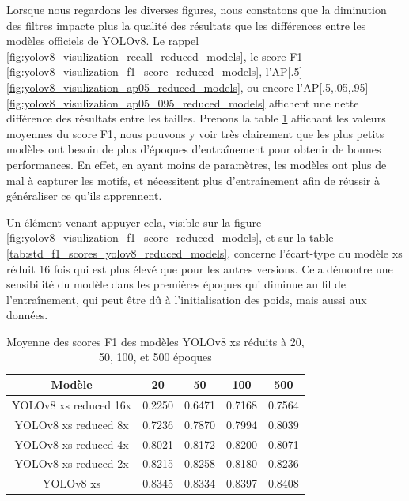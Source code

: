 \break

Lorsque nous regardons les diverses figures, nous constatons que la diminution des filtres impacte plus la qualité des résultats que les différences entre les modèles officiels de YOLOv8. Le rappel \ref{fig:yolov8_visulization_recall_reduced_models}, le score F1 \ref{fig:yolov8_visulization_f1_score_reduced_models}, l'AP[.5] \ref{fig:yolov8_visulization_ap05_reduced_models}, ou encore l'AP[.5,.05,.95] \ref{fig:yolov8_visulization_ap05_095_reduced_models} affichent une nette différence des résultats entre les tailles. Prenons la table \ref{tab:mean_f1_scores_yolov8_reduced_models} affichant les valeurs moyennes du score F1, nous pouvons y voir très clairement que les plus petits modèles ont besoin de plus d'époques d'entraînement pour obtenir de bonnes performances. En effet, en ayant moins de paramètres, les modèles ont plus de mal à capturer les motifs, et nécessitent plus d'entraînement afin de réussir à généraliser ce qu'ils apprennent.

Un élément venant appuyer cela, visible sur la figure \ref{fig:yolov8_visulization_f1_score_reduced_models}, et sur la table \ref{tab:std_f1_scores_yolov8_reduced_models}, concerne l'écart-type du modèle xs réduit 16 fois qui est plus élevé que pour les autres versions. Cela démontre une sensibilité du modèle dans les premières époques qui diminue au fil de l'entraînement, qui peut être dû à l'initialisation des poids, mais aussi aux données.

\begin{table}[!ht]
    \caption{Moyenne des scores F1 des modèles YOLOv8 xs réduits à 20, 50, 100, et 500 époques}
    \label{tab:mean_f1_scores_yolov8_reduced_models}
    \centering
    \begin{tabular}{ |c||c|c|c|c|  }
        \hline
        \rowcolor{gray!50}
        Modèle & 20 & 50 & 100 & 500\\
        \hline
        YOLOv8 xs reduced 16x & 0.2250 & 0.6471 & 0.7168 & 0.7564\\
        YOLOv8 xs reduced 8x & 0.7236 & 0.7870 & 0.7994 & 0.8039\\
        YOLOv8 xs reduced 4x & 0.8021 & 0.8172 & 0.8200 & 0.8071\\
        YOLOv8 xs reduced 2x & 0.8215 & 0.8258 & 0.8180  & 0.8236\\
        YOLOv8 xs & 0.8345 & 0.8334 & 0.8397 & 0.8408\\
        \hline
    \end{tabular}
\end{table}


